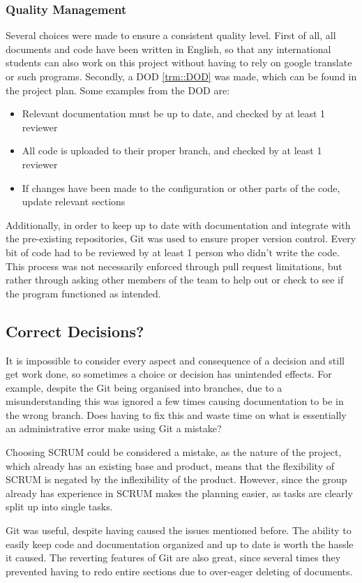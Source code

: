 \subsubsection{Quality Management}
Several choices were made to ensure a consistent quality level.
First of all, all documents and code have been written in English, so that any international students can also work on this project without having to rely on google translate or such programs.
Secondly, a DOD \ref{trm::DOD} was made, which can be found in the project plan.
Some examples from the DOD are:
\begin{itemize}
\item Relevant documentation must be up to date, and checked by at least 1 reviewer
\item All code is uploaded to their proper branch, and checked by at least 1 reviewer
\item If changes have been made to the configuration or other parts of the code, update relevant sections
\end{itemize}
Additionally, in order to keep up to date with documentation and integrate with the pre-existing repositories, Git was used to ensure proper version control.
Every bit of code had to be reviewed by at least 1 person who didn't write the code.
This process was not necessarily enforced through pull request limitations, but rather through asking other members of the team to help out or check to see if the program functioned as intended.

\subsection{Correct Decisions?}
It is impossible to consider every aspect and consequence of a decision and still get work done, so sometimes a choice or decision has unintended effects. 
For example, despite the Git being organised into branches, due to a misunderstanding this was ignored a few times causing documentation to be in the wrong branch.
Does having to fix this and waste time on what is essentially an administrative error make using Git a mistake?

Choosing SCRUM could be considered a mistake, as the nature of the project, which already has an existing base and product, means that the flexibility of SCRUM is negated by the inflexibility of the product.
However, since the group already has experience in SCRUM makes the planning easier, as tasks are clearly split up into single tasks.

Git was useful, despite having caused the issues mentioned before.
The ability to easily keep code and documentation organized and up to date is worth the hassle it caused.
The reverting features of Git are also great, since several times they prevented having to redo entire sections due to over-eager deleting of documents.

\newpage
